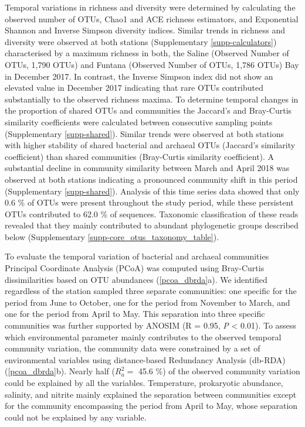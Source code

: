 \documentclass[
  12pt,
]{article}
\begin{document}
Temporal variations in richness and diversity were determined by
calculating the observed number of OTUs, Chao1 and ACE richness
estimators, and Exponential Shannon and Inverse Simpson diversity
indices. Similar trends in richness and diversity were observed at both
stations (Supplementary \autoref{supp-calculators}) characterised by a
maximum richness in both, the Saline (Observed Number of OTUs, 1,790
OTUs) and Funtana (Observed Number of OTUs, 1,786 OTUs) Bay in December
2017. In contrast, the Inverse Simpson index did not show an elevated
value in December 2017 indicating that rare OTUs contributed
substantially to the observed richness maxima. To determine temporal
changes in the proportion of shared OTUs and communities the Jaccard's
and Bray-Curtis similarity coefficients were calculated between
consecutive sampling points (Supplementary \autoref{supp-shared}).
Similar trends were observed at both stations with higher stability of
shared bacterial and archaeal OTUs (Jaccard's similarity coefficient)
than shared communities (Bray-Curtis similarity coefficient). A
substantial decline in community similarity between March and April 2018
was observed at both stations indicating a pronounced community shift in
this period (Supplementary \autoref{supp-shared}). Analysis of this time
series data showed that only 0.6 \si{\percent} of OTUs were present
throughout the study period, while these persistent OTUs contributed to
62.0 \si{\percent} of sequences. Taxonomic classification of these reads
revealed that they mainly contributed to abundant phylogenetic groups
described below (Supplementary \autoref{supp-core_otus_taxonomy_table}).

To evaluate the temporal variation of bacterial and archaeal communities
Principal Coordinate Analysis (PCoA) was computed using Bray-Curtis
dissimilarities based on OTU abundances (\autoref{pcoa_dbrda}a). We
identified regardless of the station sampled three separate communities:
one specific for the period from June to October, one for the period
from November to March, and one for the period from April to May. This
separation into three specific communities was further supported by
ANOSIM (R = 0.95, \emph{P} \textless{} 0.01). To assess which
environmental parameter mainly contributes to the observed temporal
community variation, the community data were constrained by a set of
environmental variables using distance-based Redundancy Analysis
(db-RDA) (\autoref{pcoa_dbrda}b). Nearly half (\(R^2_a=\) 45.6
\si{\percent}) of the observed community variation could be explained by
all the variables. Temperature, prokaryotic abundance, salinity, and
nitrite mainly explained the separation between communities except for
the community encompassing the period from April to May, whose
separation could not be explained by any variable.
\end{document}
